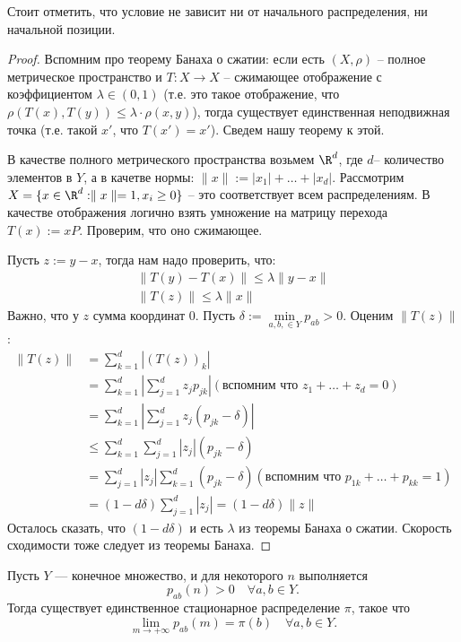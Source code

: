 Стоит отметить, что условие не зависит ни от начального распределения, ни начальной позиции. 

\begin{proof}
    Вспомним про теорему Банаха о сжатии: если есть $(X, \rho)$ -- полное метрическое пространство и $T:X \to X$ -- сжимающее отображение с коэффициентом $\lambda \in (0, 1)$ (т.е. это такое отображение, что $\rho(T(x), T(y)) \le \lambda \cdot \rho(x, y)$), тогда существует единственная неподвижная точка (т.е. такой $x'$, что $T(x')=x'$). Сведем нашу теорему к этой.
    
    В качестве полного метрического пространства возьмем $\R^d$, где $d$-- количество элементов в $Y$, а в качетве нормы: $\parallel x \parallel  := |x_1| + \dots + |x_d|$. Рассмотрим $X = \{ x \in \R^d : \parallel x \parallel = 1, x_i \ge 0 \}$ -- это соответствует всем распределениям. В качестве отображения логично взять умножение на матрицу перехода $T(x) := xP$. Проверим, что оно сжимающее.
    
    Пусть $z := y - x$, тогда нам надо проверить, что: \begin{gather*}
        \parallel T(y) - T(x) \parallel \le \lambda \parallel y - x \parallel \\
        \parallel T(z) \parallel \le \lambda \parallel x \parallel
    \end{gather*}
    Важно, что у $z$ сумма координат 0.
    Пусть $\delta := \min\limits_{a, b, \in Y} p_{ab} > 0$.
    Оценим $\parallel T(z) \parallel$: \begin{align*}
         \parallel T(z) \parallel &= \sum_{k=1}^d |(T(z))_k| \\
         &= \sum_{k=1}^d |\sum_{j=1}^d z_jp_{jk}| (\text{вспомним что } z_1 + \dots + z_d = 0) \\
         &= \sum_{k=1}^d |\sum_{j=1}^d z_j(p_{jk} - \delta)|  \\
         &\le \sum_{k=1}^d \sum_{j=1}^d 
         |z_j|(p_{jk} - \delta) \\
         &= \sum_{j=1}^d |z_j| \sum_{k=1}^d 
         (p_{jk} - \delta) (\text{вспомним что } p_{1k} + \dots + p_{kk} = 1) \\
         &= (1-d\delta)\sum_{j=1}^d |z_j| = (1-d\delta)\parallel z \parallel
    \end{align*}
    Осталось сказать, что $(1-d\delta)$ и есть $\lambda$ из теоремы Банаха о сжатии. Скорость сходимости тоже следует из теоремы Банаха.
\end{proof}

 \begin{corollary}
     Пусть $Y$ --- конечное множество, и для некоторого $n$ выполняется
     $$p_{ab}(n) > 0 \quad \forall a, b\in Y.$$
     Тогда существует единственное стационарное распределение $\pi$, такое что
     $$\underset{m\to+\infty}{\lim} p_{ab}(m) = \pi(b)\quad \forall a, b\in Y.$$
 \end{corollary}

